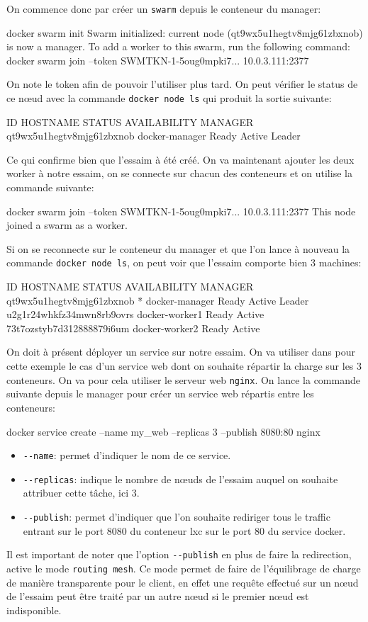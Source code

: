 \newpage
On commence donc par créer un \verb:swarm: depuis le conteneur du manager:
\begin{bash}
docker swarm init
Swarm initialized: current node (qt9wx5u1hegtv8mjg61zbxnob) is now a manager.
To add a worker to this swarm, run the following command:
    docker swarm join --token SWMTKN-1-5oug0mpki7... 10.0.3.111:2377
\end{bash}
On note le token afin de pouvoir l'utiliser plus tard. On peut vérifier le status de 
ce nœud avec la commande \verb:docker node ls: qui produit la sortie suivante:
\begin{bash}
ID                        HOSTNAME         STATUS    AVAILABILITY   MANAGER
qt9wx5u1hegtv8mjg61zbxnob docker-manager   Ready     Active         Leader
\end{bash}
Ce qui confirme bien que l'essaim à été créé. On va maintenant ajouter les deux worker à notre 
essaim, on se connecte sur chacun des conteneurs et on utilise la commande suivante:
\begin{bash}
docker swarm join --token SWMTKN-1-5oug0mpki7... 10.0.3.111:2377
This node joined a swarm as a worker.
\end{bash}
Si on se reconnecte sur le conteneur du manager et que l'on lance à nouveau la commande
\verb:docker node ls:, on peut voir que l'essaim comporte bien 3 machines:
\begin{bash}
ID                          HOSTNAME         STATUS    AVAILABILITY   MANAGER
qt9wx5u1hegtv8mjg61zbxnob * docker-manager   Ready     Active         Leader 
u2g1r24whkfz34mwn8rb9ovrs   docker-worker1   Ready     Active                
73t7ozstyb7d312888879i6um   docker-worker2   Ready     Active                
\end{bash}
On doit à présent déployer un service sur notre essaim. On va utiliser dans pour cette exemple
le cas d'un service web dont on souhaite répartir la charge sur les 3 conteneurs. On va pour cela
utiliser le serveur web \verb:nginx:. On lance la commande suivante depuis le manager 
pour créer un service web répartis entre les conteneurs:
\begin{bash}
docker service create --name my_web --replicas 3 --publish 8080:80 nginx
\end{bash}
\begin{itemize}
    \item \verb:--name:: permet d'indiquer le nom de ce service.
    \item \verb:--replicas:: indique le nombre de nœuds de l'essaim auquel on souhaite
        attribuer cette tâche, ici 3.
    \item \verb:--publish:: permet d'indiquer que l'on souhaite rediriger tous le traffic 
        entrant sur le port 8080 du conteneur lxc sur le port 80 du service docker.  
\end{itemize}
Il est important de noter que l'option \verb:--publish: en plus de faire la redirection,
active le mode \verb:routing mesh:. Ce mode permet de faire de l'équilibrage de charge de
manière transparente pour le client, en effet une requête effectué sur un nœud de l'essaim 
peut être traité par un autre nœud si le premier nœud est indisponible. 

